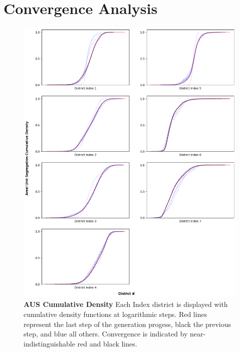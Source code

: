 \documentclass{article}
\begin{document}
\pagebreak



\pagebreak
\appendix
\section{Convergence Analysis}\label{Appendix A}

\begin{figure}[h]
    \centering
    \includegraphics[scale=.4]{images/asu_kde_convergence.png}
    \caption{\textbf{AUS Cumulative Density} Each Index district is displayed with cumulative density functions at logarithmic steps. Red lines represent the last step of the generation progess, black the previous step, and blue all others. Convergence is indicated by near-indistinguishable red and black lines.}
\end{figure}
\end{document}

